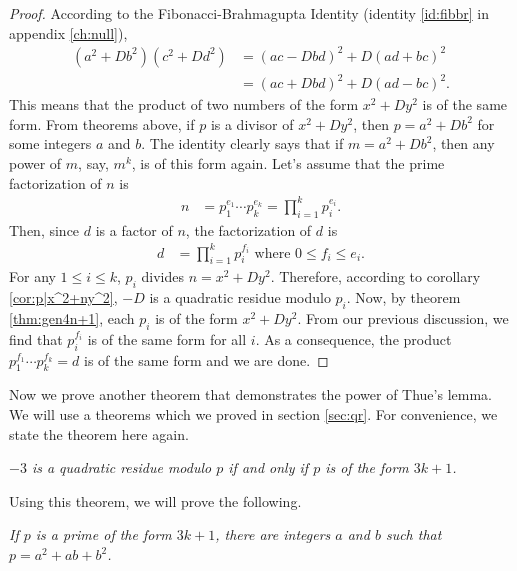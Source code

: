 \documentclass{subfile}
\begin{document}
	\begin{proof}
		According to the Fibonacci-Brahmagupta Identity (identity \eqref{id:fibbr} in appendix \eqref{ch:null}),
			\begin{align*}
				(a^2+Db^2)(c^2+Dd^2)& =(ac-Dbd)^2+D(ad+bc)^2\\
				& =(ac+Dbd)^2+D(ad-bc)^2.
			\end{align*}
		This means that the product of two numbers of the form $x^2+Dy^2$ is of the same form. From theorems above, if $p$ is a divisor of $x^2+Dy^2$, then $p=a^2+Db^2$ for some integers $a$ and $b$. The identity clearly says that if $m=a^2+Db^2$, then any power of $m$, say, $m^k$, is of this form again. Let's assume that the prime factorization of $n$ is
			\begin{align*}
				n & = p_1^{e_1}\cdots p_k^{e_k} = \prod_{i=1}^{k}p_i^{e_i}.
			\end{align*}
		Then, since $d$ is a factor of $n$, the factorization of $d$ is
			\begin{align*}
				d & = \prod_{i=1}^{k}p_i^{f_i}\text{ where }0\leq f_i\leq e_i.
			\end{align*}
		For any $1\leq i\leq k$, $p_i$ divides $n=x^2+Dy^2$. Therefore, according to corollary \eqref{cor:p|x^2+ny^2}, $-D$ is a quadratic residue modulo $p_i$. Now, by theorem \eqref{thm:gen4n+1}, each $p_i$ is of the form $x^2+Dy^2$. From our previous discussion, we find that $p_i^{f_i}$ is of the same form for all $i$. As a consequence, the product $p_1^{f_1}\cdots p_k^{f_k}=d$ is of the same form and we are done.
	\end{proof}
	Now we prove another theorem that demonstrates the power of Thue's lemma. We will use a theorems which we proved in section \eqref{sec:qr}. For convenience, we state the theorem here again.
		\begin{theorem}\slshape
			$-3$ is a quadratic residue modulo $p$ if and only if $p$ is of the form $3k+1$.
		\end{theorem}
	Using this theorem, we will prove the following.
		\begin{theorem}\slshape
			If $p$ is a prime of the form $3k+1$, there are integers $a$ and $b$ such that $p=a^2+ab+b^2$.
		\end{theorem}
	
\end{document}
